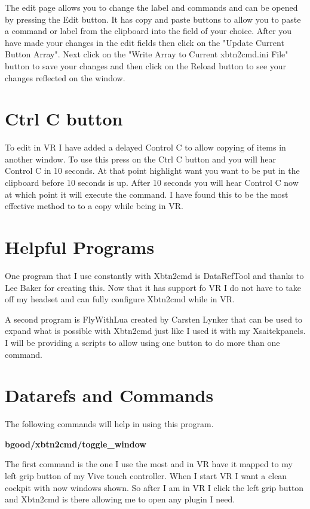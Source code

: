 \documentclass[11pt,parskip=half,a4paper]{scrartcl}
\begin{document}
The edit page allows you to change the label and commands and can be opened by pressing the Edit button. It has copy and paste buttons to allow you to paste a command or label from the clipboard into the field of your choice. After you have made your changes in the edit fields then click on the "Update Current Button Array". Next click on the "Write Array to Current xbtn2cmd.ini File" button to save your changes and then click on the Reload button to see your changes reflected on the window. 

\newpage
\section{Ctrl C button}

To edit in VR I have added a delayed Control C to allow copying of items in another window. To use this press on the Ctrl C button and you will hear Control C in 10 seconds. At that point highlight want you want to be put in the clipboard before 10 seconds is up. After 10 seconds you will hear Control C now at which point it will execute the command. I have found this to be the most effective method to to a copy while being in VR.

\newpage
\section{Helpful Programs}

One program that I use constantly with Xbtn2cmd is DataRefTool and thanks to Lee Baker for creating this. Now that it has support fo VR I do not have to take off my headset and can fully configure Xbtn2cmd while in VR.

A second program is FlyWithLua created by Carsten Lynker that can be used to expand what is possible with Xbtn2cmd just like I used it with my Xsaitekpanels. I will be providing a scripts to allow using one button to do more than one command.

\newpage
\section{Datarefs and Commands}

The following commands will help in using this program.

{\bfseries bgood/xbtn2cmd/toggle\_window}

The first command is the one I use the most and in VR have it mapped to my left grip button of my Vive touch controller. When I start VR I want a clean cockpit with now windows shown. So after I am in VR I click the left grip button and Xbtn2cmd is there allowing me to open any plugin I need.
\end{document}
